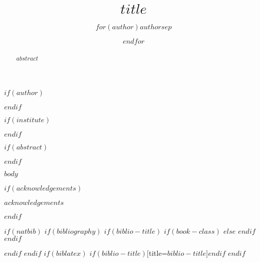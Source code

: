\documentclass[$journal$, online, hvmath]{style/$online$}
\begin{document}
\sloppy

\title{$title$}

$if(author)$
\author{$for(author)$$author$$sep$ \and $endfor$}
$endif$

$if(institute)$
\providecommand{\institute}[1]{}
\institute{$for(institute)$$institute$$sep$ \and $endfor$}
$endif$





\maketitle

$if(abstract)$
\begin{abstract}
$abstract$
\end{abstract}
$endif$

$body$

$if(acknowledgements)$
\begin{acknowledgements}
$acknowledgements$
\end{acknowledgements}
$endif$

$if(natbib)$
$if(bibliography)$
$if(biblio-title)$
$if(book-class)$
\renewcommand\bibname{$biblio-title$}
$else$
\renewcommand\refname{$biblio-title$}
$endif$
$endif$

$endif$
$endif$
$if(biblatex)$
\printbibliography$if(biblio-title)$[title=$biblio-title$]$endif$
$endif$
\end{document}
